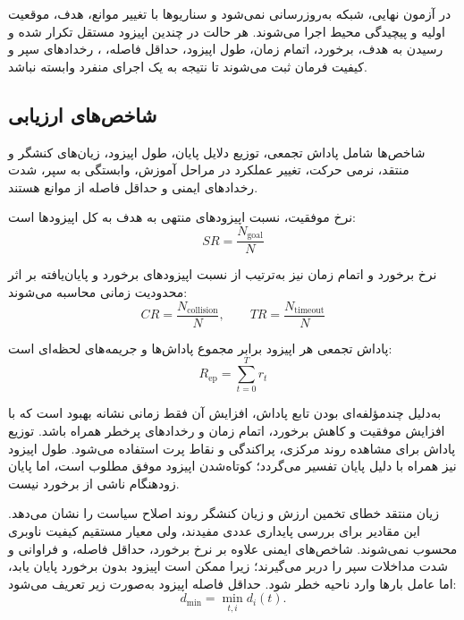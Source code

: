 در آزمون نهایی، شبکه به‌روزرسانی نمی‌شود و سناریوها با تغییر موانع، هدف، موقعیت اولیه و پیچیدگی محیط اجرا می‌شوند. هر حالت در چندین اپیزود مستقل تکرار شده و رسیدن به هدف، برخورد، اتمام زمان، طول اپیزود، حداقل فاصله، ، رخدادهای سپر و کیفیت فرمان ثبت می‌شوند تا نتیجه به یک اجرای منفرد وابسته نباشد.

\subsection{شاخص‌های ارزیابی}
\label{subsec:evaluation_metrics}

شاخص‌ها شامل پاداش تجمعی، توزیع دلایل پایان، طول اپیزود، زیان‌های کنشگر و منتقد، نرمی حرکت، تغییر عملکرد در مراحل آموزش، وابستگی به سپر، شدت رخدادهای ایمنی و حداقل فاصله از موانع هستند.

نرخ موفقیت، نسبت اپیزودهای منتهی به هدف به کل اپیزودها است:
\begin{equation}
	SR = \frac{N_{\mathrm{goal}}}{N}
	\label{eq:success_rate_definition}
\end{equation}

نرخ برخورد و اتمام زمان نیز به‌ترتیب از نسبت اپیزودهای برخورد و پایان‌یافته بر اثر محدودیت زمانی محاسبه می‌شوند:
\begin{equation}
	CR = \frac{N_{\mathrm{collision}}}{N},
	\qquad
	TR = \frac{N_{\mathrm{timeout}}}{N}
	\label{eq:collision_timeout_rate_definition}
\end{equation}

پاداش تجمعی هر اپیزود برابر مجموع پاداش‌ها و جریمه‌های لحظه‌ای است:
\begin{equation}
	R_{\mathrm{ep}} = \sum_{t=0}^{T} r_t
	\label{eq:episode_return_definition}
\end{equation}

به‌دلیل چندمؤلفه‌ای بودن تابع پاداش، افزایش آن فقط زمانی نشانه بهبود است که با افزایش موفقیت و کاهش برخورد، اتمام زمان و رخدادهای پرخطر همراه باشد. توزیع پاداش برای مشاهده روند مرکزی، پراکندگی و نقاط پرت استفاده می‌شود. طول اپیزود نیز همراه با دلیل پایان تفسیر می‌گردد؛ کوتاه‌شدن اپیزود موفق مطلوب است، اما پایان زودهنگام ناشی از برخورد نیست.

زیان منتقد خطای تخمین ارزش و زیان کنشگر روند اصلاح سیاست را نشان می‌دهد. این مقادیر برای بررسی پایداری عددی مفیدند، ولی معیار مستقیم کیفیت ناوبری محسوب نمی‌شوند. شاخص‌های ایمنی علاوه بر نرخ برخورد، حداقل فاصله،  و فراوانی و شدت مداخلات سپر را دربر می‌گیرند؛ زیرا ممکن است اپیزود بدون برخورد پایان یابد، اما عامل بارها وارد ناحیه خطر شود. حداقل فاصله اپیزود به‌صورت زیر تعریف می‌شود:
\begin{equation}
	d_{\min} = \min_{t,i} d_i(t).
	\label{eq:min_obstacle_distance_definition}
\end{equation}

